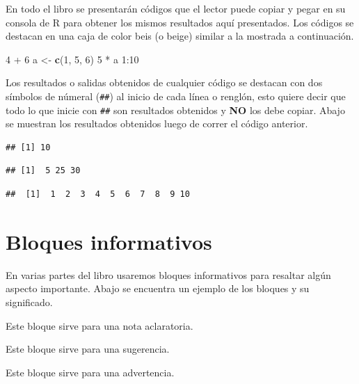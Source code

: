 \documentclass[10pt,]{krantz}
\makeatletter
\newenvironment{Shaded}{\begin{snugshade}}{\end{snugshade}}
\newcommand{\KeywordTok}[1]{\textcolor[rgb]{0.13,0.29,0.53}{\textbf{{#1}}}}
\newcommand{\DecValTok}[1]{\textcolor[rgb]{0.00,0.00,0.81}{{#1}}}
\newcommand{\StringTok}[1]{\textcolor[rgb]{0.31,0.60,0.02}{{#1}}}
\newcommand{\NormalTok}[1]{{#1}}
\let\proglang=\textsf
\newenvironment{kframe}{%
\medskip{}
\setlength{\fboxsep}{.8em}
 \def\at@end@of@kframe{}%
 \ifinner\ifhmode%
  \def\at@end@of@kframe{\end{minipage}}%
  \begin{minipage}{\columnwidth}%
 \fi\fi%
 \def\FrameCommand##1{\hskip\@totalleftmargin \hskip-\fboxsep
 \colorbox{shadecolor}{##1}\hskip-\fboxsep
     \hskip-\linewidth \hskip-\@totalleftmargin \hskip\columnwidth}%
 \MakeFramed {\advance\hsize-\width
   \@totalleftmargin\z@ \linewidth\hsize
   \@setminipage}}%
 {\par\unskip\endMakeFramed%
 \at@end@of@kframe}
\renewenvironment{Shaded}{\begin{kframe}}{\end{kframe}}
\let\BeginKnitrBlock\begin \let\EndKnitrBlock\end
\makeatother
\begin{document}
En todo el libro se presentarán códigos que el lector puede copiar y
pegar en su consola de \proglang{R} para obtener los mismos resultados
aquí presentados. Los códigos se destacan en una caja de color beis (o
beige) similar a la mostrada a continuación.

\begin{Shaded}
\begin{Highlighting}[]
\DecValTok{4} \NormalTok{+}\StringTok{ }\DecValTok{6}
\NormalTok{a <-}\StringTok{ }\KeywordTok{c}\NormalTok{(}\DecValTok{1}\NormalTok{, }\DecValTok{5}\NormalTok{, }\DecValTok{6}\NormalTok{)}
\DecValTok{5} \NormalTok{*}\StringTok{ }\NormalTok{a}
\DecValTok{1}\NormalTok{:}\DecValTok{10}
\end{Highlighting}
\end{Shaded}

Los resultados o salidas obtenidos de cualquier código se destacan con
dos símbolos de númeral (\texttt{\#\#}) al inicio de cada línea o
renglón, esto quiere decir que todo lo que inicie con \texttt{\#\#} son
resultados obtenidos y \textbf{NO} los debe copiar. Abajo se muestran
los resultados obtenidos luego de correr el código anterior.

\begin{verbatim}
## [1] 10
\end{verbatim}

\begin{verbatim}
## [1]  5 25 30
\end{verbatim}

\begin{verbatim}
##  [1]  1  2  3  4  5  6  7  8  9 10
\end{verbatim}

\section*{Bloques informativos}\label{bloques-informativos}


En varias partes del libro usaremos bloques informativos para resaltar
algún aspecto importante. Abajo se encuentra un ejemplo de los bloques y
su significado.

\BeginKnitrBlock{rmdnote}
Este bloque sirve para una nota aclaratoria.
\EndKnitrBlock{rmdnote}

\BeginKnitrBlock{rmdtip}
Este bloque sirve para una sugerencia.
\EndKnitrBlock{rmdtip}

\BeginKnitrBlock{rmdwarning}
Este bloque sirve para una advertencia.
\EndKnitrBlock{rmdwarning}
\end{document}
